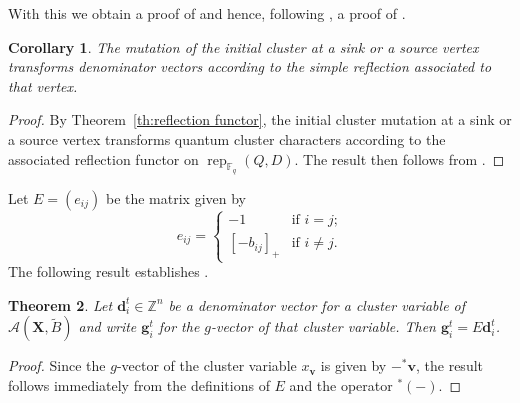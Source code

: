 \documentclass{amsart}
\newtheorem{theorem}{Theorem}
\newtheorem{corollary}[theorem]{Corollary}
\newcommand{\bfd}{\mathbf{d}}
\newcommand{\bfg}{\mathbf{g}}
\newcommand{\bfv}{\mathbf{v}}
\newcommand{\bfX}{\mathbf{X}}
\newcommand{\cA}{\mathcal{A}}
\newcommand{\FF}{\mathbb{F}}
\newcommand{\rep}{\operatorname{rep}}
\newcommand{\ZZ}{\mathbb{Z}}
\begin{document}
  With this we obtain a proof of \cite[Conj. 1.8]{reading-stella} and hence, following \cite[Prop. 1.10]{reading-stella}, a proof of \cite[Conj. 1.7]{reading-stella}.
  \begin{corollary}
    The mutation of the initial cluster at a sink or a source vertex transforms denominator vectors according to the simple reflection associated to that vertex.
  \end{corollary}
  \begin{proof}
    By Theorem~\ref{th:reflection functor}, the initial cluster mutation at a sink or a source vertex transforms quantum cluster characters according to the associated reflection functor on $\rep_{\FF_q}(Q,D)$.  The result then follows from \cite[Prop. 2.1]{dlab-ringel}.
  \end{proof}

  Let $E=(e_{ij})$ be the matrix given by
  \[e_{ij}=\begin{cases} -1 & \text{if $i=j$;}\\ [-b_{ij}]_+ & \text{if $i\ne j$.}\end{cases}\]
  The following result establishes \cite[Conj. 3.21]{reading-speyer}.
  \begin{theorem}
    \label{th:d to g}
    Let $\bfd_i^t\in\ZZ^n$ be a denominator vector for a cluster variable of $\cA(\bfX,\tilde B)$ and write $\bfg_i^t$ for the $g$-vector of that cluster variable.  Then $\bfg_i^t=E\bfd_i^t$.
  \end{theorem}
  \begin{proof}
    Since the $g$-vector of the cluster variable $x_\bfv$ is given by $-{}^*\bfv$, the result follows immediately from the definitions of $E$ and the operator ${}^*(-)$.
  \end{proof}
\end{document}
